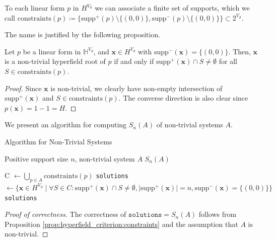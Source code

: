 \begin{definition}
To each linear form $p$ in \( H^{V_d} \) we can associate a finite set of supports, which we call $\mathrm{constraints}(p) \coloneqq \{\mathrm{supp}^+(p) \setminus \{(0,0)\}, \mathrm{supp}^-(p) \setminus \{ (0,0) \} \}  \subset 2^{V_{d}}$. 
\end{definition}

The name is justified by the following proposition.
\begin{proposition}\label{prop:hyperfield_criterion:constraints}
Let $p$ be a linear form in \( \mathbb{H}^{V_d} \), and $\mathbf{x} \in H^{V_{d}}$ with $\mathrm{supp}^-(\mathbf{x}) = \{ (0,0) \}$. Then, $\mathbf{x}$ is a non-trivial hyperfield root of $p$ if and only if $\mathrm{supp}^+(\mathbf{x}) \cap S \neq \emptyset$ for all $S \in \mathrm{constraints}(p)$. 
\end{proposition}

\begin{proof}
Since $\mathbf{x}$ is non-trivial, we clearly have non-empty intersection of $\mathrm{supp}^+(\mathbf{x})$ and $S \in \mathrm{constraints}(p)$. The converse direction is also clear since $p(\mathbf{x}) = 1 - 1 = H$.
\end{proof}

We present an algorithm for computing $S_{n}(A)$ of non-trivial systems $A$.

\begin{algorithm}
\caption{Algorithm for Non-Trivial Systems}\label{alg:hyperfield_criterion:efficient}
    \begin{algorithmic}[1]
    \Require Positive support size $n$, non-trivial system $A$ 
    \Ensure $S_{n}(A)$

        \State C $\gets \bigcup_{p \in A}\mathrm{constraints}(p)$
        \State \texttt{solutions} $\gets \{ \mathbf{x} \in H^{V_{d}} \mid \forall S \in C: \mathrm{supp}^+(\mathbf{\mathbf{x}}) \cap S \neq \emptyset, \vert \mathrm{supp}^+(\mathbf{x}) \vert = n,  \mathrm{supp}^-(\mathbf{x}) = \{(0,0)\}   \}$
        \State \Return \texttt{solutions}
    \EndFunction
    \end{algorithmic}  
\end{algorithm}

\begin{proof}[Proof of correctness]
The correctness of $\texttt{solutions} = S_{n}(A)$ follows from Proposition \ref{prop:hyperfield_criterion:constraints} and the assumption that $A$ is non-trivial. 
\end{proof}

